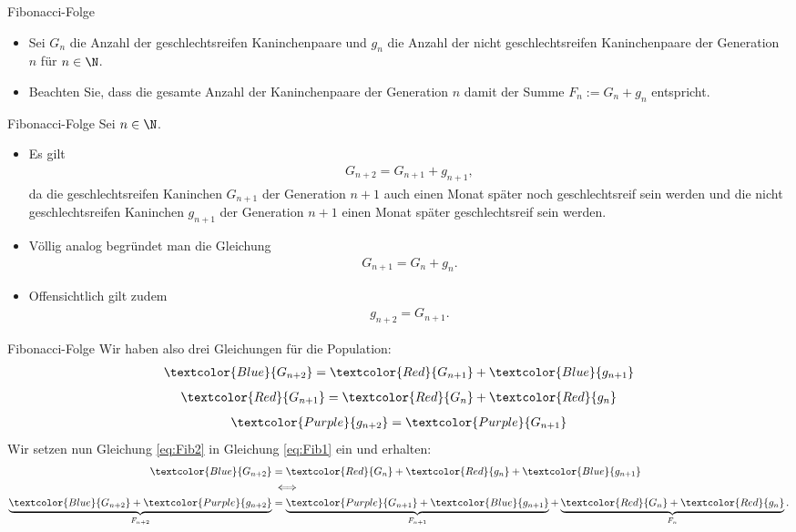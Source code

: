 \begin{frame}[fragile]{Fibonacci-Folge}
\begin{itemize}[<+->]
    \item Sei $G_n$ die Anzahl der geschlechtsreifen Kaninchenpaare und $g_n$ die Anzahl der nicht geschlechtsreifen Kaninchenpaare der Generation $n$ für $n\in\N$.
    \item Beachten Sie, dass die gesamte Anzahl der Kaninchenpaare der Generation $n$ damit der Summe $F_n := G_n+g_n$ entspricht.
\end{itemize}
\end{frame}


\begin{frame}[fragile]{Fibonacci-Folge}
Sei $n\in\N$.
\begin{itemize}[<+->]
\item Es gilt
\begin{align*}
    G_{n+2} = G_{n+1} + g_{n+1},
\end{align*}
da die geschlechtsreifen Kaninchen $G_{n+1}$ der Generation $n+1$ auch einen Monat später noch geschlechtsreif sein werden und die nicht geschlechtsreifen Kaninchen $g_{n+1}$ der Generation $n+1$ einen Monat später geschlechtsreif sein werden.
\item Völlig analog begründet man die Gleichung
\begin{align*}
    G_{n+1} = G_{n} + g_{n}.
\end{align*}
\item Offensichtlich gilt zudem
\begin{align*}
    g_{n+2}  = G_{n+1}.
\end{align*}
\end{itemize}
\end{frame}

\begin{frame}[fragile]{Fibonacci-Folge}
Wir haben also drei Gleichungen für die Population:
\begin{align}\label{eq:Fib1}
    \textcolor{Blue}{G_{n+2}} = \textcolor{Red}{G_{n+1}} +  \textcolor{Blue}{g_{n+1}}
\end{align}
\begin{align}\label{eq:Fib2}
    \textcolor{Red}{G_{n+1}} = \textcolor{Red}{G_{n}} + \textcolor{Red}{g_{n}}
\end{align}
\begin{align}\label{eq:Fib3}
    \textcolor{Purple}{g_{n+2}}  = \textcolor{Purple}{G_{n+1}}
\end{align}
Wir setzen nun Gleichung \ref{eq:Fib2} in Gleichung \ref{eq:Fib1} ein und erhalten:
\begin{align*}
    \textcolor{Blue}{G_{n+2}} &= \textcolor{Red}{G_{n}} + \textcolor{Red}{g_{n}} + \textcolor{Blue}{g_{n+1}} \\
    &\iff \\
    \underbrace{\textcolor{Blue}{G_{n+2}} + \textcolor{Purple}{g_{n+2}}}_{F_{n+2}} &= \underbrace{\textcolor{Purple}{G_{n+1}} + \textcolor{Blue}{g_{n+1}}}_{F_{n+1}} + \underbrace{\textcolor{Red}{G_{n}} + \textcolor{Red}{g_{n}}}_{F_n}.
\end{align*}
\end{frame}

